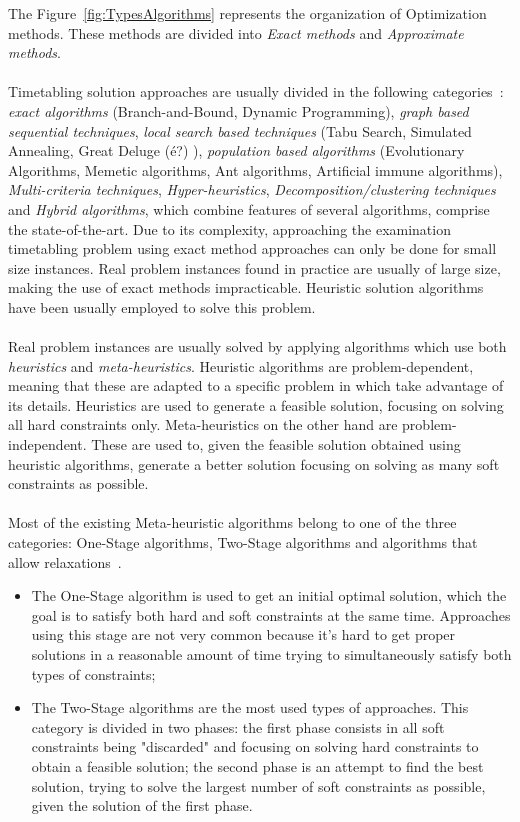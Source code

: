 The Figure~\ref{fig:TypesAlgorithms} represents the organization of Optimization methods. These methods are divided into \textit{Exact methods} and \textit{Approximate methods}.\\
\\
Timetabling solution approaches are usually divided in the following categories~\cite{Qu2009}: \textit{exact algorithms} (Branch-and-Bound, Dynamic Programming), \textit{graph based sequential techniques}, \textit{local search based techniques} (Tabu Search, Simulated Annealing, Great Deluge {\color{red} (é?)} ), \textit{population based algorithms} (Evolutionary Algorithms, Memetic algorithms, Ant algorithms, Artificial immune algorithms), \textit{Multi-criteria techniques}, \textit{Hyper-heuristics}, \textit{Decomposition/clustering techniques} and \textit{Hybrid algorithms}, which combine features of several algorithms, comprise the state-of-the-art. Due to its complexity, approaching the examination timetabling problem using exact method approaches can only be done for small size instances. Real problem instances found in practice are usually of large size, making the use of exact methods impracticable. Heuristic solution algorithms have been usually employed to solve this problem.\\
\\
Real problem instances are usually solved by applying algorithms which use both \textit{heuristics} and \textit{meta-heuristics}. Heuristic algorithms are problem-dependent, meaning that these are adapted to a specific problem in which take advantage of its details. Heuristics are used to generate a feasible solution, focusing on solving all hard constraints only. Meta-heuristics on the other hand are problem-independent. These are used to, given the feasible solution obtained using heuristic algorithms, generate a better solution focusing on solving as many soft constraints as possible.\\
\\
Most of the existing Meta-heuristic algorithms belong to one of the three categories: One-Stage algorithms, Two-Stage algorithms and algorithms that allow relaxations~\cite{Lewis2007}. 
\begin{itemize}
  \item The One-Stage algorithm is used to get an initial optimal solution, which the goal is to satisfy both hard and soft constraints at the same time. Approaches using this stage are not very common because it's hard to get proper solutions in a reasonable amount of time trying to simultaneously satisfy both types of constraints;
  \item The Two-Stage algorithms are the most used types of approaches. This category is divided in two phases: the first phase consists in all soft constraints being "discarded" and focusing on solving hard constraints to obtain a feasible solution; the second phase is an attempt to find the best solution, trying to solve the largest number of soft constraints as possible, given the solution of the first phase.
\end{itemize}

